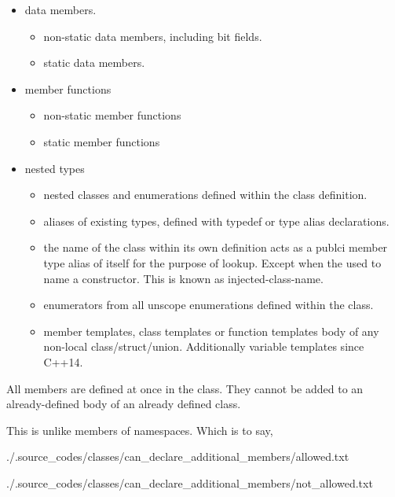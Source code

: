 \documentclass[a4paper, 12pt]{extbook}
\begin{document}
\begin{itemize}
  \item data members.
        \begin{itemize}
          \item non-static data members, including bit fields.
          \item static data members.

        \end{itemize}
  \item member functions
        \begin{itemize}
          \item non-static member functions
          \item static member functions
        \end{itemize}
  \item nested types
        \begin{itemize}
          \item nested classes and enumerations defined within the class definition.
          \item aliases of existing types, defined with typedef or type alias declarations.
          \item the name of the class within its own definition acts as a publci member type alias of itself for the purpose of lookup.
                Except when the used to name a constructor.
                This is known as injected-class-name.
          \item enumerators from all unscope enumerations defined within the class.
          \item member templates, class templates or function templates body of any non-local class/struct/union.
                Additionally variable templates since C++14.
        \end{itemize}
\end{itemize}

All members are defined at once in the class.
They cannot be added to an already-defined body of an already defined class.

This is unlike members of namespaces.
Which is to say,


{./.source_codes/classes/can_declare_additional_members/allowed.txt}


{./.source_codes/classes/can_declare_additional_members/not_allowed.txt}
\end{document}

